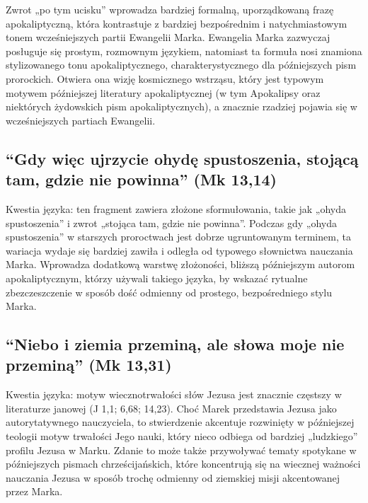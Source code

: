 Zwrot „po tym ucisku” wprowadza bardziej formalną, uporządkowaną frazę apokaliptyczną, która kontrastuje z bardziej bezpośrednim i natychmiastowym tonem wcześniejszych partii Ewangelii Marka.
Ewangelia Marka zazwyczaj posługuje się prostym, rozmownym językiem, natomiast ta formuła nosi znamiona stylizowanego tonu apokaliptycznego, charakterystycznego dla późniejszych pism prorockich.
Otwiera ona wizję kosmicznego wstrząsu, który jest typowym motywem późniejszej literatury apokaliptycznej (w tym Apokalipsy oraz niektórych żydowskich pism apokaliptycznych), a znacznie rzadziej pojawia się w wcześniejszych partiach Ewangelii.

\subsection{``Gdy więc ujrzycie ohydę spustoszenia, stojącą tam, gdzie nie powinna'' (Mk 13,14)}\label{subsec:when-you-see-the-desolating-sacrilege-set-up-where-it-ought-not-to-be-mark-1314}

Kwestia języka: ten fragment zawiera złożone sformułowania, takie jak „ohyda spustoszenia” i zwrot „stojąca tam, gdzie nie powinna”.
Podczas gdy „ohyda spustoszenia” w starszych proroctwach jest dobrze ugruntowanym terminem, ta wariacja wydaje się bardziej zawiła i odległa od typowego słownictwa nauczania Marka.
Wprowadza dodatkową warstwę złożoności, bliższą późniejszym autorom apokaliptycznym, którzy używali takiego języka, by wskazać rytualne zbezczeszczenie w sposób dość odmienny od prostego, bezpośredniego stylu Marka.

\subsection{``Niebo i ziemia przeminą, ale słowa moje nie przeminą'' (Mk 13,31)}\label{subsec:heaven-and-earth-will-pass-away-but-my-words-will-not-pass-away-mark-1331}

Kwestia języka: motyw wiecznotrwałości słów Jezusa jest znacznie częstszy w literaturze janowej (J 1,1; 6,68; 14,23).
Choć Marek przedstawia Jezusa jako autorytatywnego nauczyciela, to stwierdzenie akcentuje rozwinięty w późniejszej teologii motyw trwałości Jego nauki, który nieco odbiega od bardziej „ludzkiego” profilu Jezusa w Marku.
Zdanie to może także przywoływać tematy spotykane w późniejszych pismach chrześcijańskich, które koncentrują się na wiecznej ważności nauczania Jezusa w sposób trochę odmienny od ziemskiej misji akcentowanej przez Marka.

